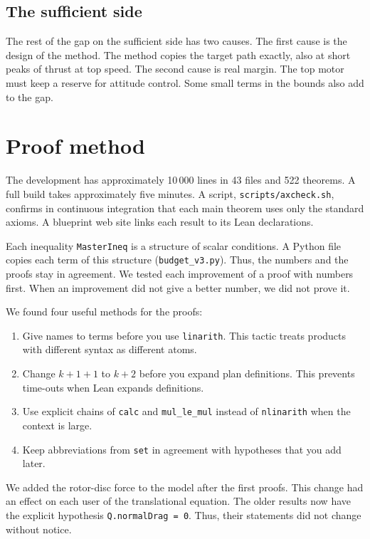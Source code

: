 \documentclass[11pt]{article}
\theoremstyle{definition}
\newcommand{\lean}[1]{\texttt{\small #1}}
\begin{document}
\subsection{The sufficient side}

The rest of the gap on the sufficient side has two causes.
The first cause is the design of the method.
The method copies the target path exactly, also at short peaks of thrust at top speed.
The second cause is real margin.
The top motor must keep a reserve for attitude control.
Some small terms in the bounds also add to the gap.

\section{Proof method}

The development has approximately 10\,000 lines in 43 files and 522 theorems.
A full build takes approximately five minutes.
A script, \lean{scripts/axcheck.sh}, confirms in continuous integration that each main theorem uses
only the standard axioms.
A blueprint web site links each result to its Lean declarations.

Each inequality \lean{MasterIneq} is a structure of scalar conditions.
A Python file copies each term of this structure (\lean{budget\_v3.py}).
Thus, the numbers and the proofs stay in agreement.
We tested each improvement of a proof with numbers first.
When an improvement did not give a better number, we did not prove it.

We found four useful methods for the proofs:
\begin{enumerate}
\item Give names to terms before you use \lean{linarith}.
This tactic treats products with different syntax as different atoms.
\item Change $k+1+1$ to $k+2$ before you expand plan definitions.
This prevents time-outs when Lean expands definitions.
\item Use explicit chains of \lean{calc} and \lean{mul\_le\_mul} instead of \lean{nlinarith} when
the context is large.
\item Keep abbreviations from \lean{set} in agreement with hypotheses that you add later.
\end{enumerate}

We added the rotor-disc force to the model after the first proofs.
This change had an effect on each user of the translational equation.
The older results now have the explicit hypothesis \lean{Q.normalDrag = 0}.
Thus, their statements did not change without notice.
\end{document}
